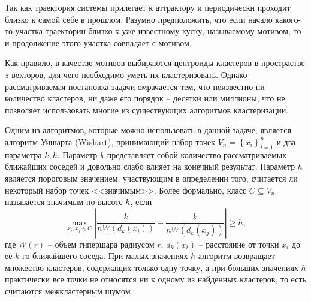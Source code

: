 
Так как траектория системы прилегает к аттрактору и периодически проходит близко к самой себе в прошлом.
Разумно предположить, что если начало какого-то участка траектории близко к уже известному куску, называемому мотивом, то и продолжение этого участка совпадает с мотивом.

Как правило, в качестве мотивов выбираются центроиды кластеров в прострастве $z$-векторов, для чего необходимо уметь их кластеризовать.
Однако рассматриваемая постановка задачи омрачается тем, что неизвестно ни количество кластеров, ни даже его порядок -- десятки или миллионы, что не позволяет использовать многие из существующих алгоритмов кластеризации.

Одним из алгоритмов, которые можно использовать в данной задаче, является алгоритм Уишарта (Wishart), принимающий набор точек $V_n = \left\{ x_i \right\}_{i=1}^{n}$ и два параметра $k, h$.
Параметр $k$ представляет собой количество рассматриваемых ближайших соседей и довольно слабо влияет на конечный результат.
Параметр $h$ является пороговым значением, участвующим в определении того, считается ли некоторый набор точек <<значимым>>.
Более формально, класс $C \subseteq V_n$ называется значимым по высоте $h$, если
\begin{equation*}
    \max_{x_i, x_j \in C}
    \left| \frac{k}{n W(d_k(x_i))} - \frac{k}{n W(d_k(x_j))} \right| \geq h,
\end{equation*}
где $W(r)$ -- объем гипершара радиусом $r$, $d_k(x_i)$ -- расстояние от точки $x_i$ до ее $k$-го ближайшего соседа.
При малых значениях $h$ алгоритм возвращает множество кластеров, содержащих только одну точку, а при больших значениях $h$ практически все точки не относятся ни к одному из найденных кластеров, то есть считаются межкластерным шумом.

